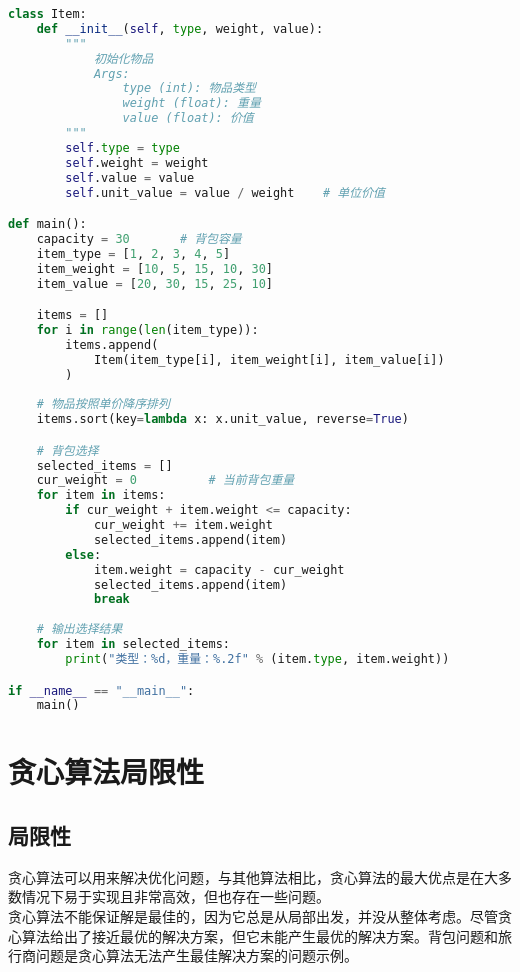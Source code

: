 \begin{lstlisting}[language=Python]
class Item:
    def __init__(self, type, weight, value):
        """
            初始化物品
            Args:
                type (int): 物品类型
                weight (float): 重量
                value (float): 价值
        """
        self.type = type
        self.weight = weight
        self.value = value
        self.unit_value = value / weight    # 单位价值

def main():
    capacity = 30       # 背包容量
    item_type = [1, 2, 3, 4, 5]
    item_weight = [10, 5, 15, 10, 30]
    item_value = [20, 30, 15, 25, 10]

    items = []
    for i in range(len(item_type)):
        items.append(
            Item(item_type[i], item_weight[i], item_value[i])
        )
    
    # 物品按照单价降序排列
    items.sort(key=lambda x: x.unit_value, reverse=True)

    # 背包选择
    selected_items = []
    cur_weight = 0          # 当前背包重量
    for item in items:
        if cur_weight + item.weight <= capacity:
            cur_weight += item.weight
            selected_items.append(item)
        else:
            item.weight = capacity - cur_weight
            selected_items.append(item)
            break
    
    # 输出选择结果
    for item in selected_items:
        print("类型：%d，重量：%.2f" % (item.type, item.weight))

if __name__ == "__main__":
    main()
\end{lstlisting}

\newpage

\section{贪心算法局限性}

\subsection{局限性}

贪心算法可以用来解决优化问题，与其他算法相比，贪心算法的最大优点是在大多数情况下易于实现且非常高效，但也存在一些问题。\\

贪心算法不能保证解是最佳的，因为它总是从局部出发，并没从整体考虑。尽管贪心算法给出了接近最优的解决方案，但它未能产生最优的解决方案。背包问题和旅行商问题是贪心算法无法产生最佳解决方案的问题示例。\\

